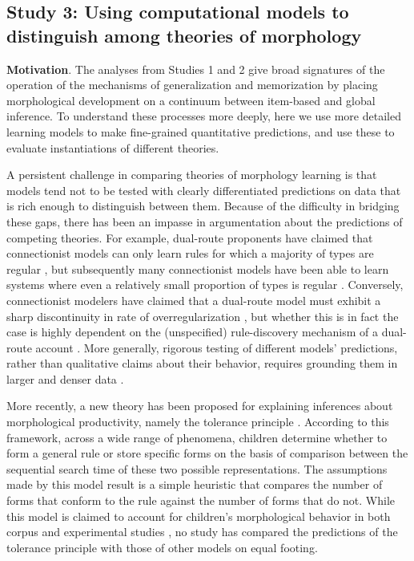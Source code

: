 \documentclass[
   11pt,
       ]{book}
\begin{document}
\hypertarget{study-3-using-computational-models-to-distinguish-among-theories-of-morphology}{%
\subsection{Study 3: Using computational models to distinguish among theories of morphology}\label{study-3-using-computational-models-to-distinguish-among-theories-of-morphology}}

\textbf{Motivation}. The analyses from Studies 1 and 2 give broad signatures of the operation of the mechanisms of generalization and memorization by placing morphological development on a continuum between item-based and global inference. To understand these processes more deeply, here we use more detailed learning models to make fine-grained quantitative predictions, and use these to evaluate instantiations of different theories.

A persistent challenge in comparing theories of morphology learning is that models tend not to be tested with clearly differentiated predictions on data that is rich enough to distinguish between them. Because of the difficulty in bridging these gaps, there has been an impasse in argumentation about the predictions of competing theories. For example, dual-route proponents have claimed that connectionist models can only learn rules for which a majority of types are regular \citep[e.g.,][]{marcus1995jcl}, but subsequently many connectionist models have been able to learn systems where even a relatively small proportion of types is regular \citep{hahn2000, nakisa1996, plunkett1997}. Conversely, connectionist modelers have claimed that a dual-route model must exhibit a sharp discontinuity in rate of overregularization \citep[e.g.][]{hoeffner1996}, but whether this is in fact the case is highly dependent on the (unspecified) rule-discovery mechanism of a dual-route account \citep{odonnell2015}. More generally, rigorous testing of different models' predictions, rather than qualitative claims about their behavior, requires grounding them in larger and denser data \citep{meylan2017}.

More recently, a new theory has been proposed for explaining inferences about morphological productivity, namely the tolerance principle \citep{yang2016}. According to this framework, across a wide range of phenomena, children determine whether to form a general rule or store specific forms on the basis of comparison between the sequential search time of these two possible representations. The assumptions made by this model result is a simple heuristic that compares the number of forms that conform to the rule against the number of forms that do not. While this model is claimed to account for children's morphological behavior in both corpus and experimental studies \citep{schuler2016, yang2016}, no study has compared the predictions of the tolerance principle with those of other models on equal footing.
\end{document}
